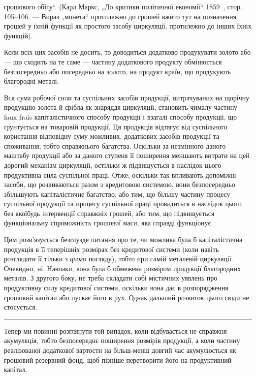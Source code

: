\parcont{}  %
грошового обігу“. (Карл Маркс, „До критики політичної економії“
1859~, стор. 105--106. — Вираз „монета“ протилежно до грошей вжито
тут на позначення грошей у їхній функції як простого засобу циркуляції,
протилежно до інших їхніх функцій).

Коли всіх цих засобів не досить, то доводиться додатково продукувати
золото або — що сходить на те саме — частину додаткового продукту
обмінюється безпосередньо або посередньо на золото, на продукт країн,
що продукують благородні металі.

Вся сума робочої сили та суспільних засобів продукції, витрачуваних
на щорічну продукцію золота й срібла як знаряддя циркуляції, становить
чималу частину faux frais капіталістичного способу продукції і взагалі
способу продукції, що ґрунтується на товаровій продукції. Ця продукція
відтягує від суспільного користання відповідну суму можливих,
додаткових засобів продукції та споживання, тобто справжнього багатства.
Оскільки за незмінного даного маштабу продукції або за даного ступеня
її поширення меншають витрати на цей дорогий механізм циркуляції,
остільки ж підвищується в наслідок цього продуктивна сила суспільної
праці. Отже, оскільки так впливають допоміжні засоби, що розвиваються
разом з кредитовою системою, вони безпосередньо збільшують капіталістичне
багатство, або тим, що більшу частину процесу суспільної продукції
та процесу суспільної праці провадиться в наслідок цього без
якоїбудь інтервенції справжніх грошей, або тим, що підвищується
функціональну спроможність грошової маси, яка справді функціонує.

Цим розв’язується безглузде питання про те, чи можлива була б
капіталістична продукція в її теперішніх розмірах без кредитової системи
(коли навіть розглядати її тільки з \emph{цього} погляду), тобто при самій
металевій циркуляції. Очевидно, ні. Навпаки, вона була б обмежена розміром
продукції благородних металів. З другого боку, не треба складати собі
містичних уявлень про продуктивну силу кредитової системи, оскільки
вона дає в розпорядження грошовий капітал або пускає його в рух.
Однак дальший розвиток цього сюди не стосується.
\pfbreak
Тепер ми повинні розглянути той випадок, коли відбувається не
справжня акумуляція, тобто безпосереднє поширення розмірів продукції,
а коли частину реалізованої додаткової вартости на більш-менш довгий
час акумулюється як грошовий резервний фонд, щоб пізніше перетворити
його на продуктивний капітал.

